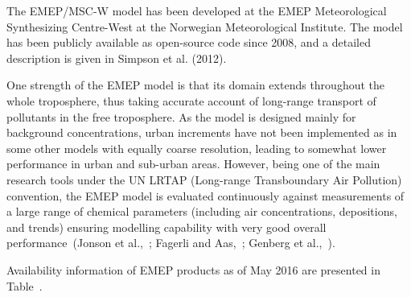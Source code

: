\documentclass[9pt]{report}
\begin{document}
\noindent{}The EMEP/MSC-W model has been developed at the EMEP Meteorological Synthesizing Centre-West at the Norwegian Meteorological Institute.
The model has been publicly available as open-source code since 2008, and a detailed description is given in Simpson et al. (2012).%

One strength of the EMEP model is that its domain extends throughout the whole troposphere, thus taking accurate account of long-range transport of pollutants in the free troposphere.
As the model is designed mainly for background concentrations, urban increments have not been implemented as in some other models with equally coarse resolution, leading to somewhat lower performance in urban and sub-urban areas.
However, being one of the main research tools under the UN LRTAP (Long-range Transboundary Air Pollution) convention, the EMEP model is evaluated continuously against measurements of a large range of chemical parameters (including air concentrations, depositions, and trends) ensuring modelling capability with very good overall performance~(Jonson et al.,~; Fagerli and Aas,~; Genberg et al.,~).%

Availability information of EMEP products as of May 2016 are presented in Table~.%
\end{document}
